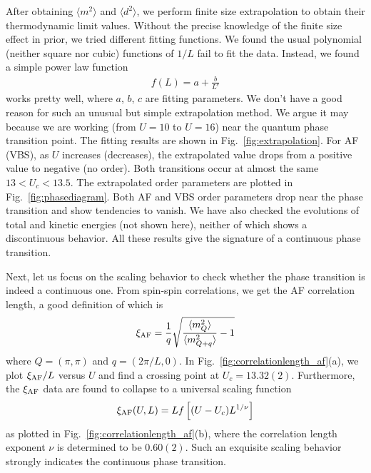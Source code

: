 \documentclass[twocolumn,superscriptaddress]{revtex4-1}
\begin{document}
After obtaining $\langle m^2 \rangle$ and $\langle d^2 \rangle$, we perform finite size extrapolation to obtain their thermodynamic limit values. Without the precise knowledge of the finite size effect in prior, we tried different fitting functions. We found the usual polynomial (neither square nor cubic) functions of $1/L$ fail to fit the data. Instead, we found a simple power law function
\begin{eqnarray}\label{eq:fitting}
f(L)=a+\frac{b}{L^c}
\end{eqnarray}
works pretty well, where $a$, $b$, $c$ are fitting parameters. We don't have a good reason for such an unusual but simple extrapolation method. We argue it may because we are working (from $U=10$ to $U=16$) near the quantum phase transition point. The fitting results are shown in Fig.~\ref{fig:extrapolation}. For AF (VBS), as $U$ increases (decreases), the extrapolated value drops from a positive value to negative (no order). Both transitions occur at almost the same $13<U_c<13.5$. The extrapolated order parameters are plotted in Fig.~\ref{fig:phasediagram}. Both AF and VBS order parameters drop near the phase transition and show tendencies to vanish. We have also checked the evolutions of total and kinetic energies (not shown here), neither of which shows a discontinuous behavior. All these results give the signature of a continuous phase transition.





Next, let us focus on the scaling behavior to check whether the phase transition is indeed a continuous one. From spin-spin correlations, we get the AF correlation length, a good definition of which is \cite{Sandvik2010a}
\begin{eqnarray}
  \xi_{\rm AF}=\frac{1}{q}\sqrt{\frac{\langle m_Q^2 \rangle}{\langle m_{Q+q}^2 \rangle}-1}
\end{eqnarray}
where $Q=(\pi,\pi)$ and $q=(2\pi/L,0)$. In Fig.~\ref{fig:correlationlength_af}(a), we plot $\xi_{\rm AF}/L$ versus $U$ and find a crossing point at $U_c=13.32(2)$. Furthermore, the $\xi_{\rm AF}$ data are found to collapse to a universal scaling function
\begin{eqnarray}\label{eq:scalinghypothesis}
  \xi_{\rm AF}(U,L)=L f\left[(U-U_c)L^{1/\nu}\right] 
\end{eqnarray}
as plotted in Fig.~\ref{fig:correlationlength_af}(b), where the correlation length exponent $\nu$ is determined to be $0.60(2)$. Such an exquisite scaling behavior strongly indicates the continuous phase transition. 
\end{document}
